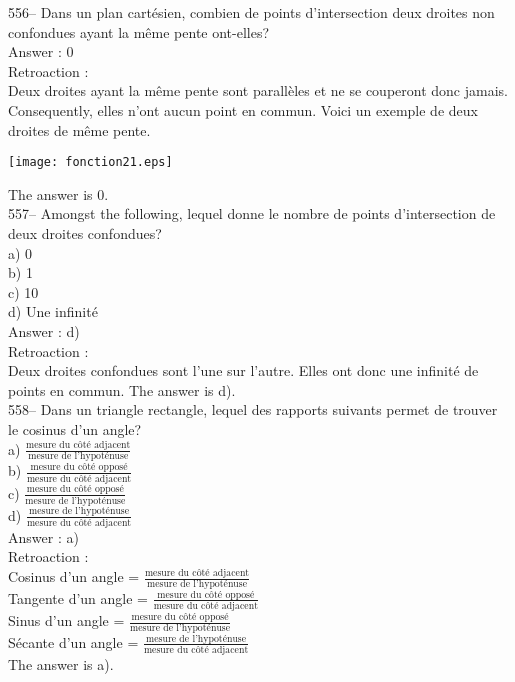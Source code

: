 ﻿\documentclass[letterpaper, 12pt]{article}
\begin{document}
556-- Dans un plan cart\'esien, combien de points d'intersection deux
droites non confondues ayant la m\^eme pente ont-elles?\\

Answer : 0\\

Retroaction :\\
Deux droites ayant la m\^eme pente sont parall\`eles et ne se couperont donc
jamais.  Consequently, elles n'ont aucun point en commun.  Voici un
exemple de deux droites de m\^eme pente.\\
    \begin{center}
    \texttt{[image: fonction21.eps]}
    \end{center}

The answer is 0.\\



557-- Amongst the following, lequel donne le nombre de points
d'intersection de deux droites confondues?\\
a) 0\\
b) 1\\
c) 10\\
d) Une infinit\'e\\

Answer : d)\\

Retroaction : \\
Deux droites confondues sont l'une sur l'autre.  Elles ont donc une
infinit\'e de points en commun.  The answer is d).\\

558-- Dans un triangle rectangle, lequel des rapports suivants permet de
trouver le cosinus d'un angle?\\[2mm]
a) $\frac{\textrm{mesure du c\^ot\'e adjacent}}{\textrm{mesure de
l'hypot\'enuse}}$\\[2mm]
b) $\frac{\textrm{mesure du c\^ot\'e oppos\'e}}{\textrm{mesure du c\^ot\'e
adjacent}}$\\[2mm]
c) $\frac{\textrm{mesure du c\^ot\'e oppos\'e}}{\textrm{mesure de
l'hypot\'enuse}}$\\[2mm]
d) $\frac{\textrm{mesure de l'hypot\'enuse}}{\textrm{mesure du c\^ot\'e
adjacent}}$\\

Answer : a)\\

Retroaction : \\
Cosinus d'un angle = $\frac{\textrm{mesure du c\^ot\'e
adjacent}}{\textrm{mesure de l'hypot\'enuse}}$\\[2mm]
Tangente d'un angle = $\frac{\textrm{mesure du c\^ot\'e
oppos\'e}}{\textrm{mesure du c\^ot\'e adjacent}}$\\[2mm]
Sinus d'un angle = $\frac{\textrm{mesure du c\^ot\'e
oppos\'e}}{\textrm{mesure de l'hypot\'enuse}}$\\[2mm]
S\'ecante d'un angle =  $\frac{\textrm{mesure de
l'hypot\'enuse}}{\textrm{mesure du c\^ot\'e adjacent}}$\\[2mm]
The answer is a).\\
\end{document}

